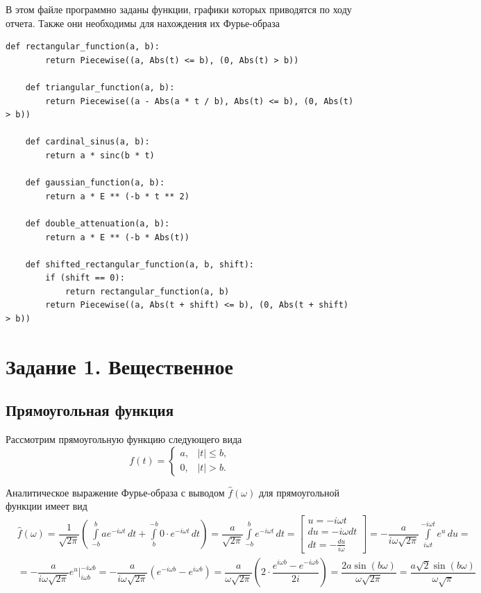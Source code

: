 \documentclass[a4paper, 16pt]{article}
\begin{document}
    \noindent В этом файле программно заданы функции, графики которых приводятся по ходу отчета. Также они необходимы
    для нахождения их Фурье-образа
    \begin{lstlisting}[label=funcs, caption=Программно заданные функции для заданий 1 и 2]
    def rectangular_function(a, b):
        return Piecewise((a, Abs(t) <= b), (0, Abs(t) > b))

    def triangular_function(a, b):
        return Piecewise((a - Abs(a * t / b), Abs(t) <= b), (0, Abs(t) > b))

    def cardinal_sinus(a, b):
        return a * sinc(b * t)
    
    def gaussian_function(a, b):
        return a * E ** (-b * t ** 2)
    
    def double_attenuation(a, b):
        return a * E ** (-b * Abs(t))

    def shifted_rectangular_function(a, b, shift):
        if (shift == 0):
            return rectangular_function(a, b)
        return Piecewise((a, Abs(t + shift) <= b), (0, Abs(t + shift) > b))
    \end{lstlisting}


    \section{Задание 1. Вещественное}
    \subsection{Прямоугольная функция}
    \noindent Рассмотрим прямоугольную функцию следующего вида
    $$
    f(t)=
    \begin{cases}
        a, & \left|t\right|\leq b,\\
        0, & \left|t\right|>b.
    \end{cases}
    $$


    \noindent Аналитическое выражение Фурье-образа с выводом
    $\hat{f}(\omega)$ для прямоугольной функции имеет вид
    \begin{align*}
        & \hat{f}(\omega)=\dfrac{1}{\sqrt{2\pi}}\left(\,\int\limits_{-b}^{b}ae^{-i\omega t}\,dt+\int\limits_{b}^{-b}0\cdot e^{-i\omega t}\,dt\right)=
        \dfrac{a}{\sqrt{2\pi}}\int\limits_{-b}^{b}e^{-i\omega t}\,dt=
        \begin{bmatrix}
            u=-i\omega t\\
            du=-i\omega dt\\
            dt=-\frac{du}{i\omega}
        \end{bmatrix}=
        -\dfrac{a}{i\omega \sqrt{2\pi}}\int\limits_{i\omega t}^{-i\omega t}e^{u}\,du=\\
        & =-\dfrac{a}{i\omega \sqrt{2\pi}}e^{u}\bigg|_{i\omega b}^{-i\omega b}=
        -\dfrac{a}{i\omega \sqrt{2\pi}}\left(e^{-i\omega b}-e^{i\omega b}\right)=\dfrac{a}{\omega \sqrt{2\pi}}\left(2\cdot\dfrac{e^{i\omega b}-e^{-i\omega b}}{2i}\right)=
        \dfrac{2a\sin{(b\omega)}}{\omega \sqrt{2\pi}}=\dfrac{a\sqrt{2}\sin{(b\omega)}}{\omega\sqrt{\pi}}
    \end{align*}
\end{document}
